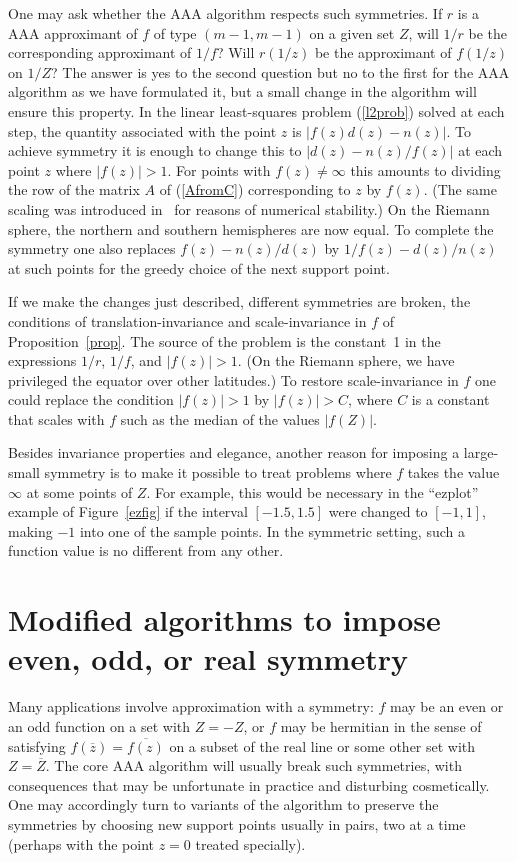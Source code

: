 \documentclass[final]{siamltex}
\begin{document}
One may ask whether the AAA algorithm respects such symmetries.
If $r$ is a AAA approximant of $f$ of type $(m-1,m-1)$ on a
given set $Z$, will $1/r$ be the corresponding approximant of
$1/f$?  Will $r(1/z)$ be the approximant of $f(1/z)$ on $1/Z$?
The answer is yes to the second question but no to the first for
the AAA algorithm as we have formulated it, but a small change
in the algorithm will ensure this property.  In the linear
least-squares problem (\ref{l2prob}) solved at each step, the
quantity associated with the point $z$ is $|f(z) d(z) - n(z)|$.
To achieve symmetry it is enough to change this to $|d(z) -
n(z)/f(z)|$ at each point $z$ where $|f(z)|>1$.  For points
with $f(z)\ne \infty$ this amounts to dividing the row of the
matrix $A$ of (\ref{AfromC}) corresponding to $z$ by $f(z)$.
(The same scaling was introduced in~\cite{in} for reasons of
numerical stability.)  On the Riemann sphere, the northern and
southern hemispheres are now equal.  To complete the symmetry
one also replaces $f(z) - n(z)/d(z)$ by $1/f(z) - d(z)/n(z)$
at such points for the greedy choice of the next support point.

If we make the changes just described, different symmetries
are broken, the conditions of translation-invariance and
scale-invariance in $f$ of Proposition~\ref{prop}.  The source of
the problem is the constant~1 in the expressions $1/r$, $1/f$,
and $|f(z)|>1$.  (On the Riemann sphere, we have privileged the
equator over other latitudes.)  To restore scale-invariance in
$f$ one could replace the condition $|f(z)|>1$ by $|f(z)|>C$,
where $C$ is a constant that scales with $f$ such as the median
of the values $|f(Z)|$.

Besides invariance properties and elegance, another reason
for imposing a large-small symmetry is to make it possible to
treat problems where $f$ takes the value $\infty$ at some points
of $Z$.  For example, this would be necessary in the ``ezplot''
example of Figure~\ref{ezfig} if the interval $[-1.5,1.5]$ were
changed to $[-1,1]$, making $-1$ into one of the sample points.
In the symmetric setting, such a function value is no different
from any other.

\section{\label{sec-symm}\boldmath Modified algorithms to impose
even, odd, or real symmetry} Many applications involve
approximation with a symmetry: $f$ may be an even or an odd
function on a set with $Z=-Z$, or $f$ may be hermitian in
the sense of satisfying $f(\overline{z}) = \overline{f(z)}$ on a
subset of the real line or some other set with $Z = \overline{Z}$.
The core AAA algorithm will usually break such symmetries, with
consequences that may be unfortunate in practice and disturbing
cosmetically.  One may accordingly turn to variants of the
algorithm to preserve the symmetries by choosing new support
points usually in pairs, two at a time (perhaps with the point
$z=0$ treated specially).
\end{document}
